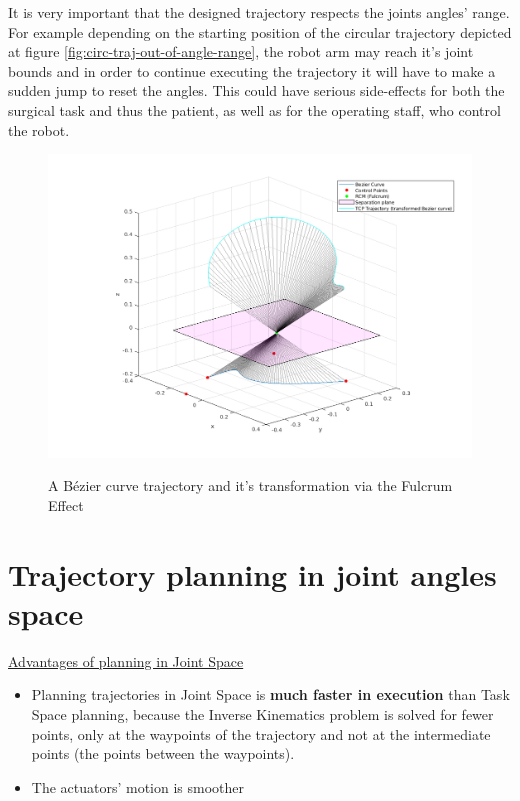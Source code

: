 It is very important that the designed trajectory respects the joints angles' range. For example
depending on the starting position of the circular trajectory depicted at figure 
\ref{fig:circ-traj-out-of-angle-range}, the robot arm may reach it's joint bounds and in order to 
continue executing the trajectory it will have to make a sudden jump to reset the angles. 
This could have serious side-effects for both the surgical task and thus the patient, as well as 
for the operating staff, who control the robot.

\begin{center}
\begin{figure}[!htb]
\centering
\includegraphics[width=\textwidth]{images/rcm_trajectories/rcm_bezier_traj.png}\\
\caption{A B\'ezier curve trajectory and it's transformation via the Fulcrum Effect}
\end{figure}
\end{center}


\section{Trajectory planning in joint angles space}

\underline{Advantages of planning in Joint Space}
\begin{itemize}
\item Planning trajectories in Joint Space is \textbf{much faster in execution} than Task Space planning, because the Inverse Kinematics problem is solved for fewer points, only at the waypoints of the trajectory 
and not at the intermediate points (the points between the waypoints).
\item The actuators' motion is smoother
\end{itemize}

